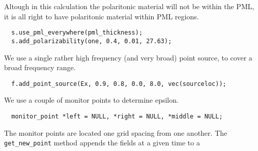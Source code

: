 \begin{comment}
const double a = 10;
const double pml_thickness = 1.0;
const double middlesize = 1.0;
const double zsize = middlesize + 2*pml_thickness;
\end{verbatim}

For our example polaritonic material, we'll use an $\epsilon(0)$ of 13.4. %

\begin{verbatim}
double eps(const vec &) { return 13.4; }
\end{verbatim}
\begin{comment}
double one(const vec &p) {
  return 1;
}

int main(int argc, char **argv) {
  initialize mpi(argc, argv);
  deal_with_ctrl_c();
  const double ttot =2000.0;
  const volume v = volone(zsize, a);
  const symmetry S = mirror(Z, v);
  structure s(v, eps, 0, S);
  const char *dirname = make_output_directory(__FILE__);
  s.set_output_directory(dirname);
\end{comment}
Altough in this calculation the polaritonic material will not be within the
PML, it is all right to have polaritonic material within PML regions.
\begin{verbatim}
  s.use_pml_everywhere(pml_thickness);
  s.add_polarizability(one, 0.4, 0.01, 27.63);
\end{verbatim}
\begin{comment}
  fields f(&s);
  double sourceloc = pml_thickness+1.0/(double)a;
\end{comment}
We use a single rather high frequency (and very broad) point source, to
cover a broad frequency range.
\begin{verbatim}
  f.add_point_source(Ex, 0.9, 0.8, 0.0, 8.0, vec(sourceloc));
\end{verbatim}
We use a couple of monitor points to determine epsilon.
\begin{verbatim}
  monitor_point *left = NULL, *right = NULL, *middle = NULL;
\end{verbatim}
\begin{comment}
  double next_printtime = 100;
  while (f.time() <= ttot && !interrupt) {
    if (f.time() >= next_printtime) {
      next_printtime += 100;
      master_printf("Working on time %
      master_printf("energy is %
    }
\end{comment}
The monitor points are located one grid spacing from one another.  The
\verb*|get_new_point| method appends the fields at a given time to a
